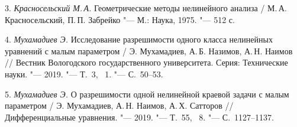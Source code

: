 3. {\it Красносельский М.\,А. }
Геометрические методы нелинейного анализа / М.\,А. Красносельский,
П.\,П. Забрейко "--- М.: Наука, 1975. "--- 512 с.

4. {\it Мухамадиев Э. }
Исследование разрешимости одного класса нелинейных уравнений с
малым параметром  / Э. Мухамадиев, А.\,Б. Назимов, А.\,Н. Наимов
// Вестник Вологодского государственного университета. Серия:
Технические науки. "--- 2019. "--- Т.~3, \No~1. "--- С.~50--53.

5. {\it Мухамадиев Э. }
О разрешимости одной нелинейной краевой задачи с малым параметром
/ Э. Мухамадиев, А.\,Н. Наимов, А.\,Х. Сатторов
// Дифференциальные уравнения. "--- 2019. "--- Т.~55, \No~8. "--- С.~1127--1137.
